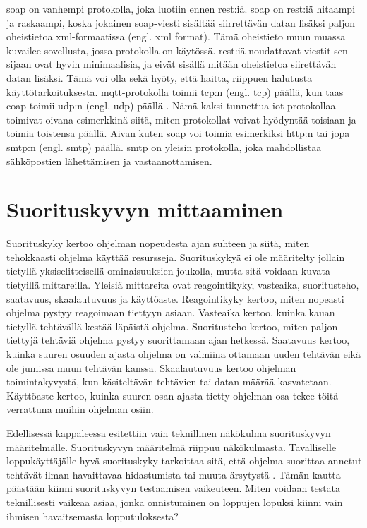 \acrshort{soap} on vanhempi protokolla, joka luotiin ennen \acrshort{rest}:iä. \acrshort{soap} on \acrshort{rest}:iä hitaampi ja raskaampi, koska jokainen \acrshort{soap}-viesti sisältää siirrettävän datan lisäksi paljon oheistietoa \acrshort{xml}-formaatissa (engl. \acrlong{xml} format). Tämä oheistieto muun muassa kuvailee sovellusta, jossa protokolla on käytössä. \acrshort{rest}:iä noudattavat viestit sen sijaan ovat hyvin minimaalisia, ja eivät sisällä mitään oheistietoa siirettävän datan lisäksi. Tämä voi olla sekä hyöty, että haitta, riippuen halutusta käyttötarkoituksesta. \parencite{SOAPvsREST} \acrshort{mqtt}-protokolla toimii \acrshort{tcp}:n (engl. \acrlong{tcp}) päällä, kun taas \acrshort{coap} toimii \acrshort{udp}:n (engl. \acrlong{udp}) päällä \parencite{MQTTvsCoAP}. Nämä kaksi tunnettua \acrshort{iot}-protokollaa toimivat oivana esimerkkinä siitä, miten protokollat voivat hyödyntää toisiaan ja toimia toistensa päällä. Aivan kuten \acrshort{soap} voi toimia esimerkiksi \acrshort{http}:n tai jopa \acrshort{smtp}:n (engl. \acrlong{smtp}) päällä. \acrshort{smtp} on yleisin protokolla, joka mahdollistaa sähköpostien lähettämisen ja vastaanottamisen. 

\section{Suorituskyvyn mittaaminen}
\label{sec:suorituskyky}
Suorituskyky kertoo ohjelman nopeudesta ajan suhteen ja siitä, miten tehokkaasti ohjelma käyttää resursseja. Suorituskykyä ei ole määritelty jollain tietyllä yksiselitteisellä ominaisuuksien joukolla, mutta sitä voidaan kuvata tietyillä mittareilla. Yleisiä mittareita ovat reagointikyky, vasteaika, suoritusteho, saatavuus, skaalautuvuus ja käyttöaste. \parencites[4]{WhatIsSoftwarePerformance}[2]{PerformanceTestingGuidanceForWebApplications}[2-3]{TheArtOfApplication} Reagointikyky kertoo, miten nopeasti ohjelma pystyy reagoimaan tiettyyn asiaan. Vasteaika kertoo, kuinka kauan tietyllä tehtävällä kestää läpäistä ohjelma. Suoritusteho kertoo, miten paljon tiettyjä tehtäviä ohjelma pystyy suorittamaan ajan hetkessä. Saatavuus kertoo, kuinka suuren osuuden ajasta ohjelma on valmiina ottamaan uuden tehtävän eikä ole jumissa muun tehtävän kanssa. Skaalautuvuus kertoo ohjelman toimintakyvystä, kun käsiteltävän tehtävien tai datan määrää kasvatetaan. Käyttöaste kertoo, kuinka suuren osan ajasta tietty ohjelman osa tekee töitä verrattuna muihin ohjelman osiin.

Edellisessä kappaleessa esitettiin vain teknillinen näkökulma suorituskyvyn määritelmälle. Suorituskyvyn määritelmä riippuu näkökulmasta. Tavalliselle loppukäyttäjälle hyvä suorituskyky tarkoittaa sitä, että ohjelma suorittaa annetut tehtävät ilman havaittavaa hidastumista tai muuta ärsytystä \parencite[1-2]{TheArtOfApplication}. Tämän kautta päästään kiinni suorituskyvyn testaamisen vaikeuteen. Miten voidaan testata teknillisesti vaikeaa asiaa, jonka onnistuminen on loppujen lopuksi kiinni vain ihmisen havaitsemasta lopputuloksesta? 

